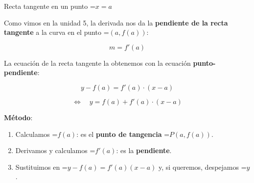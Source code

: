 \documentclass[11pt,a4paper]{article}
\newcommand{\fmm}[1]{\setbox0=\hbox{$#1$}\ifdim\wd0>\linewidth\[#1\]\else\mbox{\box0}\fi}
\newcommand{\fmuline}[1]{\textbf{\color{fmaccent}#1}}
\begin{document}
  
\begin{fmdef}{Recta tangente en un punto \fmm{x=a}}
\par\noindent \begin{minipage}[t]{0.48\linewidth}\vspace{0pt}\raggedright Como vimos en la unidad 5, la derivada nos da la \textbf{pendiente de la recta tangente} a la curva en el punto \fmm{(a,f(a))}:

          
\[m=f'(a)\]

          

La ecuación de la recta tangente la obtenemos con la ecuación \textbf{punto-pendiente}:

          
\[y-f(a)=f'(a)\cdot(x-a)\]

\[\Longleftrightarrow\quad y=f(a)+f'(a)\cdot(x-a)\]
\end{minipage}\hfill\begin{minipage}[t]{0.48\linewidth}\vspace{0pt}\raggedright \begin{center}\end{center}\end{minipage}\par\medskip

      

\newpage

\fmuline{Método}:

      
\begin{enumerate}
\item Calculamos \fmm{f(a)}: es el \textbf{punto de tangencia} \fmm{P(a,f(a))}.
\item Derivamos y calculamos \fmm{f'(a)}: es la \textbf{pendiente}.
\item Sustituimos en \fmm{y-f(a)=f'(a)(x-a)} y, si queremos, despejamos \fmm{y}.
\end{enumerate}
\end{fmdef}
\end{document}

